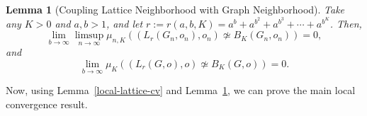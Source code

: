 \documentclass[10pt]{amsart}
\newtheorem{lemma}[theorem]{Lemma}
\begin{document}
\begin{lemma}  [Coupling Lattice Neighborhood with Graph Neighborhood] \label{lattice-to-graph} Take any $K > 0$ and $a, b > 1$, and let $r := r(a,b,K) = a^b + a^{b^2} + a^{b^3} + \cdots + a^{b^K}$. Then,
\begin{equation}
    \lim_{b \to \infty} \limsup_{n \to \infty} \mu_{n, K}((L_r(G_n, o_n), o_n) \not\simeq B_K(G_n, o_n)) = 0,
\end{equation}
and
\begin{equation}
    \lim_{b \to \infty} \mu_K((L_r(G, o), o) \not\simeq B_K(G, o)) = 0.
\end{equation}    
\end{lemma}
Now, using Lemma~\ref{local-lattice-cv} and Lemma~\ref{lattice-to-graph}, we can prove the main local convergence result.
\end{document}
